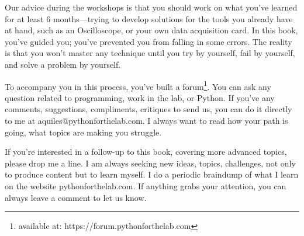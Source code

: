 Our advice during the workshops is that you should work on what you've learned for at least 6 months—trying to develop solutions for the tools you already have at hand, such as an Oscilloscope, or your own data acquisition card. In this book, you've guided you; you've prevented you from falling in some errors. The reality is that you won't master any technique until you try by yourself, fail by yourself, and solve a problem by yourself.

To accompany you in this process, you've built a forum\footnote{available at: https://forum.pythonforthelab.com}.  You can ask any question related to programming, work in the lab, or Python. If you've any comments, suggestions, compliments, critiques to send us, you can do it directly to me at aquiles@pythonforthelab.com. I always want to read how your path is going, what topics are making you struggle.

If you're interested in a follow-up to this book, covering more advanced topics, please drop me a line. I am always seeking new ideas, topics, challenges, not only to produce content but to learn myself. I do a periodic braindump of what I learn on the website pythonforthelab.com. If anything grabs your attention, you can always leave a comment to let us know.
